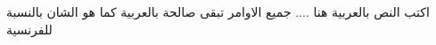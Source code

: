 \documentclass[12pt, a4paper]{article}
\begin{document}
 
اكتب النص بالعربية هنا ....
جميع الاوامر تبقى صالحة بالعربية كما هو الشان بالنسبة للفرنسية 
\end{document}
